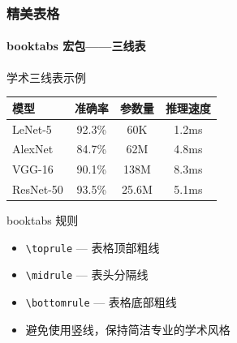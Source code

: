 \begin{frame}
\frametitle{精美表格}
\framesubtitle{booktabs 宏包——三线表}

\begin{block}{学术三线表示例}
\centering
\begin{tabular}{lccc}
\toprule
\textbf{模型} & \textbf{准确率} & \textbf{参数量} & \textbf{推理速度} \\
\midrule
LeNet-5    & 92.3\% & 60K   & 1.2ms \\
AlexNet    & 84.7\% & 62M   & 4.8ms \\
VGG-16     & 90.1\% & 138M  & 8.3ms \\
ResNet-50  & 93.5\% & 25.6M & 5.1ms \\
\bottomrule
\end{tabular}
\end{block}

\vspace{0.3em}

\begin{exampleblock}{booktabs 规则}
\begin{itemize}
  \item \texttt{\textbackslash toprule} — 表格顶部粗线
  \item \texttt{\textbackslash midrule} — 表头分隔线
  \item \texttt{\textbackslash bottomrule} — 表格底部粗线
  \item 避免使用竖线，保持简洁专业的学术风格
\end{itemize}
\end{exampleblock}
\end{frame}

